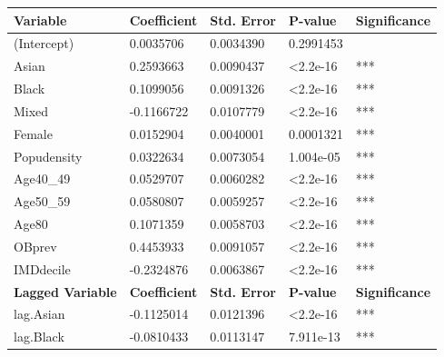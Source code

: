 \begin{table}[]
\centering
\begin{tabular}{|l|l|l|l|l|}
\hline
\textbf{Variable} & \textbf{Coefficient} & \textbf{Std. Error} & \textbf{P-value} & \textbf{Significance} \\ \hline
(Intercept)       & 0.0035706            & 0.0034390           & 0.2991453        &                       \\ \hline
Asian             & 0.2593663            & 0.0090437           & \textless 2.2e-16 & ***                   \\ \hline
Black             & 0.1099056            & 0.0091326           & \textless 2.2e-16 & ***                   \\ \hline
Mixed             & -0.1166722           & 0.0107779           & \textless 2.2e-16 & ***                   \\ \hline
Female            & 0.0152904            & 0.0040001           & 0.0001321        & ***                   \\ \hline
Popudensity       & 0.0322634            & 0.0073054           & 1.004e-05        & ***                   \\ \hline
Age40\_49         & 0.0529707            & 0.0060282           & \textless 2.2e-16 & ***                   \\ \hline
Age50\_59         & 0.0580807            & 0.0059257           & \textless 2.2e-16 & ***                   \\ \hline
Age80             & 0.1071359            & 0.0058703           & \textless 2.2e-16 & ***                   \\ \hline
OBprev            & 0.4453933            & 0.0091057           & \textless 2.2e-16 & ***                   \\ \hline
IMDdecile         & -0.2324876           & 0.0063867           & \textless 2.2e-16 & ***                   \\ \hline \hline
\multicolumn{1}{|l|}{\textbf{Lagged Variable}} & \multicolumn{1}{l|}{\textbf{Coefficient}} & \multicolumn{1}{l|}{\textbf{Std. Error}} & \multicolumn{1}{l|}{\textbf{P-value}}  & \textbf{Significance} \\ \hline
lag.Asian         & -0.1125014           & 0.0121396           & \textless 2.2e-16 & ***                   \\ \hline
lag.Black         & -0.0810433           & 0.0113147           & 7.911e-13        & ***                   \\ \hline

\end{tabular}
\end{table}

